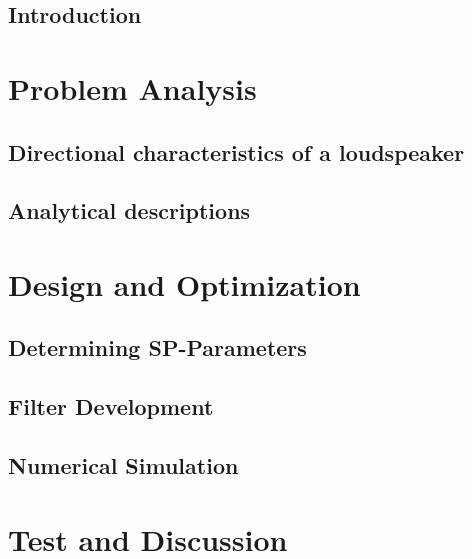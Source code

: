 \glsresetall
 \graphicspath{{figures/analysing/}}
\chapter{Introduction}\label{ch:intro}

\part{Problem Analysis}\label{pt:analysis} \glsresetall
 \graphicspath{{figures/analysing/}}
	\chapter{Directional characteristics of a loudspeaker}\label{ch:directional}
		
		
	\chapter{Analytical descriptions}\label{ch:analytical}
		


	



\part{Design and Optimization}\label{pt:design} 
\graphicspath{{figures/design/}}	
\chapter{Determining SP-Parameters}\label{ch:optimization}
	 		
\chapter{Filter Development}
	
\chapter{Numerical Simulation}\label{ch:numerical} 
	  
	 


\part{Test and Discussion}\label{pt:test}
\graphicspath{{figures/tests/}}
